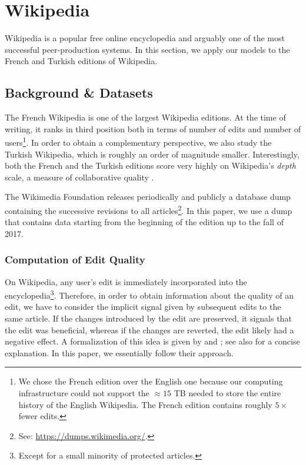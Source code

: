 \documentclass[format=sigconf]{acmart}
\begin{document}
\section{Wikipedia}
\label{sec:wikipedia}

Wikipedia is a popular free online encyclopedia and arguably one of the most successful peer-production systems.
In this section, we apply our models to the French and Turkish editions of Wikipedia.

\subsection{Background \& Datasets}

The French Wikipedia is one of the largest Wikipedia editions.
At the time of writing, it ranks in third position both in terms of number of edits and number of users\footnote{%
We chose the French edition over the English one because our computing infrastructure could not support the $\approx15$ TB needed to store the entire history of the English Wikipedia.
The French edition contains roughly $5\times$ fewer edits.
}.
In order to obtain a complementary perspective, we also study the Turkish Wikipedia, which is roughly an order of magnitude smaller.
Interestingly, both the French and the Turkish editions score very highly on Wikipedia's \emph{depth} scale, a measure of collaborative quality \citep{wikimedia2017depth}.

The Wikimedia Foundation releases periodically and publicly a database dump containing the successive revisions to all articles\footnote{%
See: \url{https://dumps.wikimedia.org/}.}.
In this paper, we use a dump that contains data starting from the beginning of the edition up to the fall of 2017.

\subsubsection{Computation of Edit Quality}

On Wikipedia, any user's edit is immediately incorporated into the encyclopedia\footnote{Except for a small minority of protected articles.}.
Therefore, in order to obtain information about the quality of an edit, we have to consider the implicit signal given by subsequent edits to the same article.
If the changes introduced by the edit are preserved, it signals that the edit was beneficial, whereas if the changes are reverted, the edit likely had a negative effect.
A formalization of this idea is given by \citet{adler2007content} and \citet{druck2008learning};
see also \citet{dealfaro2013content} for a concise explanation.
In this paper, we essentially follow their approach.
\end{document}
